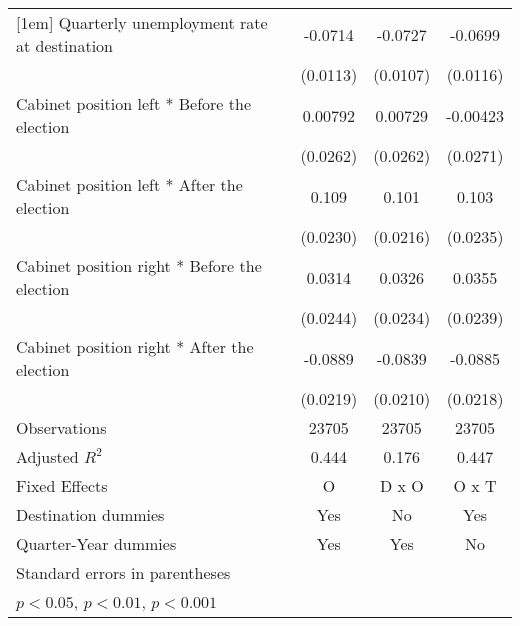 \begin{table}[htbp]
\begin{tabular}{l*{3}{c}}
[1em]
Quarterly unemployment rate at destination&     -0.0714\sym{***}&     -0.0727\sym{***}&     -0.0699\sym{***}\\
                    &    (0.0113)         &    (0.0107)         &    (0.0116)         \\
[1em]
Cabinet position left * Before the election&     0.00792         &     0.00729         &    -0.00423         \\
                    &    (0.0262)         &    (0.0262)         &    (0.0271)         \\
[1em]
Cabinet position left * After the election&       0.109\sym{***}&       0.101\sym{***}&       0.103\sym{***}\\
                    &    (0.0230)         &    (0.0216)         &    (0.0235)         \\
[1em]
Cabinet position right * Before the election&      0.0314         &      0.0326         &      0.0355         \\
                    &    (0.0244)         &    (0.0234)         &    (0.0239)         \\
[1em]
Cabinet position right * After the election&     -0.0889\sym{***}&     -0.0839\sym{***}&     -0.0885\sym{***}\\
                    &    (0.0219)         &    (0.0210)         &    (0.0218)         \\
\hline
Observations        &       23705         &       23705         &       23705         \\
Adjusted \(R^{2}\)  &       0.444         &       0.176         &       0.447         \\
Fixed Effects       &           O         &       D x O         &       O x T         \\
Destination dummies &         Yes         &          No         &         Yes         \\
Quarter-Year dummies&         Yes         &         Yes         &          No         \\
\hline\hline
\multicolumn{4}{l}{\footnotesize Standard errors in parentheses}\\
\multicolumn{4}{l}{\footnotesize \sym{*} \(p<0.05\), \sym{**} \(p<0.01\), \sym{***} \(p<0.001\)}\\
\end{tabular}
\end{table}
